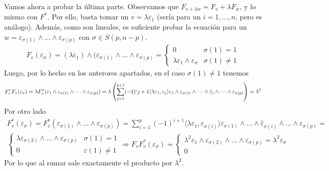 \documentclass[twoside]{article}
\begin{document}
\begin{solucion}
Vamos ahora a probar la última parte. Observamos que $F_{v+\lambda w}=F_v+\lambda F_w$, y lo mismo con $F^*$. Por ello, basta tomar un $v=\lambda\varepsilon_1$ (sería para un $i=1,\dots, n$, pero es análogo). Además, como son lineales, es suficiente probar la ecuación para un $w=\varepsilon_{\sigma(1)}\land\dots\land\varepsilon_{\sigma(p)}$ con $\sigma\in S(p,n-p)$.
\begin{gather*}
F_v(\varepsilon_{\sigma})=(\lambda\varepsilon_1)\land(\varepsilon_{\sigma(1)}\land\dots\land\varepsilon_{\sigma(p)}=\begin{cases}
0 & \sigma(1)=1\\
\lambda\varepsilon_1\land\varepsilon_{\sigma} & \sigma(1)\neq 1
\end{cases}
\end{gather*}
Luego, por lo hecho en los anterores apartados, en el caso $\sigma(1)\neq 1$ tenemos
\begin{gather*}
F^*_vF_v(\varepsilon_{\sigma})=\lambda F^*_v(\varepsilon_1\land\varepsilon_{\sigma(1)}\land\dots\land\varepsilon_{\sigma(p)})=\lambda\left(\sum_{j=1}^{p+1}(-1)`{j+1}\langle\lambda\varepsilon_1,\varepsilon_j\rangle\varepsilon_1\land\varepsilon_{\sigma(1)}\land\dots\land\hat{\varepsilon}_i\land\dots\land\varepsilon_{\sigma(p)}  \right)=\lambda^2
\end{gather*}
Por otro lado 
\begin{gather*}
F^*_v(\varepsilon_{\sigma})=F^*_v(\varepsilon_{\sigma(1)}\land\dots\land\varepsilon_{\sigma(p)})=\sum_{i=1}^p(-1)^{i+1}\langle\lambda\varepsilon_1,\varepsilon_{\sigma(i)}\rangle \varepsilon_{\sigma(1)}\land\dots\land\hat{\varepsilon}_{\sigma(i)}\land\dots\land \varepsilon_{\sigma(p)}=\\
\begin{cases}
\lambda
\varepsilon_{\sigma(2)}\land\dots\land\varepsilon_{\sigma(p)} & \sigma(1)=1\\
0 & \varepsilon(1)\neq 1
\end{cases}\Rightarrow F_vF^*_v(\varepsilon_{\sigma})=\begin{cases}
\lambda^2\varepsilon_1\land\varepsilon_{\sigma(2)}\land\dots\land\varepsilon_{\sigma(p)}=\lambda^2\varepsilon_{\sigma}\\
0
\end{cases}
\end{gather*}
Por lo que al sumar sale exactamente el producto por $\lambda^2$.
\end{solucion}

\newpage
\end{document}
